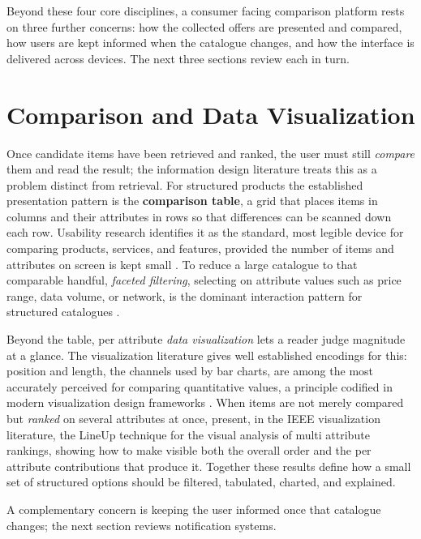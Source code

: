 Beyond these four core disciplines, a consumer facing comparison platform rests on three further concerns: how the collected offers are presented and compared, how users are kept informed when the catalogue changes, and how the interface is delivered across devices. The next three sections review each in turn.

\section{Comparison and Data Visualization}

Once candidate items have been retrieved and ranked, the user must still \emph{compare} them and read the result; the information design literature treats this as a problem distinct from retrieval. For structured products the established presentation pattern is the \textbf{comparison table}, a grid that places items in columns and their attributes in rows so that differences can be scanned down each row. Usability research identifies it as the standard, most legible device for comparing products, services, and features, provided the number of items and attributes on screen is kept small \parencite{NielsenComparisonTables}. To reduce a large catalogue to that comparable handful, \emph{faceted filtering}, selecting on attribute values such as price range, data volume, or network, is the dominant interaction pattern for structured catalogues \parencite{Vandic2024Faceted, AliCaputo2023Facet}.

Beyond the table, per attribute \emph{data visualization} lets a reader judge magnitude at a glance. The visualization literature gives well established encodings for this: position and length, the channels used by bar charts, are among the most accurately perceived for comparing quantitative values, a principle codified in modern visualization design frameworks \parencite{Munzner2014}. When items are not merely compared but \emph{ranked} on several attributes at once, \textcite{Gratzl2013LineUp} present, in the IEEE visualization literature, the LineUp technique for the visual analysis of multi attribute rankings, showing how to make visible both the overall order and the per attribute contributions that produce it. Together these results define how a small set of structured options should be filtered, tabulated, charted, and explained.

A complementary concern is keeping the user informed once that catalogue changes; the next section reviews notification systems.

